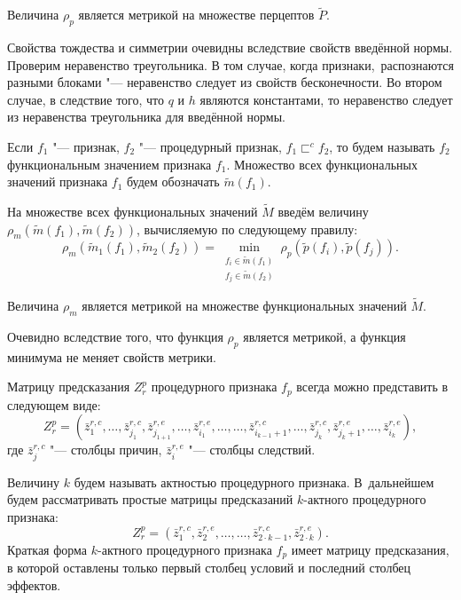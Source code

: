 \begin{Pred}
	Величина $\rho_p$ является метрикой на множестве перцептов $\tilde P$.
\end{Pred}

\begin{Proof}
	Свойства тождества и симметрии очевидны вследствие свойств введённой нормы. Проверим неравенство треугольника. В том случае, когда признаки,~распознаются разными блоками "--- неравенство следует из свойств бесконечности. Во втором случае, в следствие того, что $q$ и $h$ являются константами, то неравенство следует из неравенства треугольника для введённой нормы.
\end{Proof}

\begin{Def}
	Если $f_1$ "--- признак, $f_2$ "--- процедурный признак, $f_1\sqsubset^c f_2$, то будем называть $f_2$ функциональным значением признака $f_1$. Множество всех функциональных значений признака $f_1$ будем обозначать $\tilde m(f_1)$.
\end{Def}

На множестве всех функциональных значений $\tilde M$ введём величину $\rho_m(\tilde m(f_1),\tilde m(f_2))$, вычисляемую по следующему правилу:
\begin{equation}
	\rho_m(\tilde m_1(f_1),\tilde m_2(f_2 ))=\min\limits_{\substack{f_i\in\tilde m(f_1 )\\f_j\in\tilde m(f_2 )}}\rho_p(\tilde p(f_i ),\tilde p(f_j )).
\end{equation}

\begin{Pred}
	Величина $\rho_m$ является метрикой на множестве функциональных значений $\tilde M$.
\end{Pred}

\begin{Proof}
	Очевидно вследствие того, что функция $\rho_p$ является метрикой, а функция минимума не меняет свойств метрики.
\end{Proof}

Матрицу предсказания $Z_r^p$ процедурного признака $f_p$ всегда можно представить в следующем виде:
\[
	Z_r^p=(\bar z_1^{r,c},\dots,\bar z_{j_1}^{r,c},\bar z_{j_{1+1}}^{r,e},\dots,\bar z_{i_1}^{r,e},\dots,\dots,\bar z_{i_{k-1}+1}^{r,c},\dots,\bar z_{j_k}^{r,c},\bar z_{j_k+1}^{r,e},\dots,\bar z_{i_k}^{r,e}),
\]
где $\bar z_j^{r,c}$ "--- столбцы причин, $\bar z_i^{r,e}$ "--- столбцы следствий. 

Величину $k$ будем называть актностью процедурного признака. В~дальнейшем будем рассматривать простые матрицы предсказаний $k$-актного процедурного признака:
\[
	Z_r^p=(\bar z_1^{r,c},\bar z_2^{r,e},\dots,\dots,\bar z_{2\cdot k-1}^{r,c},\bar z_{2\cdot k}^{r,e}).
\]
Краткая форма $k$-актного процедурного признака $f_p$ имеет матрицу предсказания, в которой оставлены только первый столбец условий и последний столбец эффектов.

